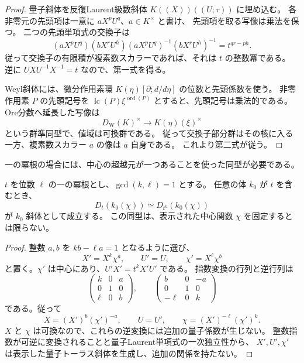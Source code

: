 \begin{proof}
量子斜体を反復Laurent級数斜体
$K((X))((U;\tau))$ に埋め込む。
各非零元の先頭項は一意に $aX^pU^q$、$a\in K^\times$ と書け、
先頭項を取る写像は乗法を保つ。
二つの先頭単項式の交換子は
\[
 (aX^pU^q)(bX^rU^h)(aX^pU^q)^{-1}(bX^rU^h)^{-1}
 =t^{qr-ph}.
\]
従って交換子の有限積が複素数スカラーであれば、それは $t$ の整数冪である。
逆に $UXU^{-1}X^{-1}=t$ なので、第一式を得る。

Weyl斜体には、微分作用素環
$K(\eta)[\partial;d/d\eta]$ の位数と先頭係数を使う。
非零作用素 $P$ の先頭記号を $\operatorname{lc}(P)\xi^{\operatorname{ord}(P)}$
とすると、先頭記号は乗法的である。
Ore分数へ延長した写像は
\[
 D_{\mathrm W}(K)^\times\longrightarrow K(\eta)(\xi)^\times
\]
という群準同型で、値域は可換群である。
従って交換子部分群はその核に入る一方、複素数スカラー $a$ の像は $a$ 自身である。
これより第二式が従う。
\end{proof}

一の冪根の場合には、中心の超越元が一つあることを使った同型が必要である。

\begin{lemma}[中心変数を混ぜる整数変換]
\label{lem:endpoint-torsion-change-v38}
$t$ を位数 $\ell$ の一の冪根とし、$\gcd(k,\ell)=1$ とする。
任意の体 $k_0$ が $t$ を含むとき、
\[
 D_t(k_0(\chi))\simeq D_{t^k}(k_0(\chi))
\]
が $k_0$ 斜体として成立する。
この同型は、表示された中心関数 $\chi$ を固定するとは限らない。
\end{lemma}

\begin{proof}
整数 $a,b$ を $kb-\ell a=1$ となるように選び、
\[
 X'=X^k\chi^a,\qquad U'=U,\qquad
 \chi'=X^\ell\chi^b
\]
と置く。$\chi'$ は中心にあり、$U'X'=t^kX'U'$ である。
指数変換の行列と逆行列は
\[
 \begin{pmatrix}k&0&a\\0&1&0\\\ell&0&b\end{pmatrix},\qquad
 \begin{pmatrix}b&0&-a\\0&1&0\\-\ell&0&k\end{pmatrix}
\]
である。従って
\[
 X=(X')^b(\chi')^{-a},\qquad U=U',\qquad
 \chi=(X')^{-\ell}(\chi')^k.
\]
$X$ と $\chi$ は可換なので、これらの逆変換には追加の量子係数が生じない。
整数指数が可逆に変換されることと量子Laurent単項式の一次独立性から、
$X',U',\chi'$ は表示した量子トーラス斜体を生成し、追加の関係を持たない。
\end{proof}

